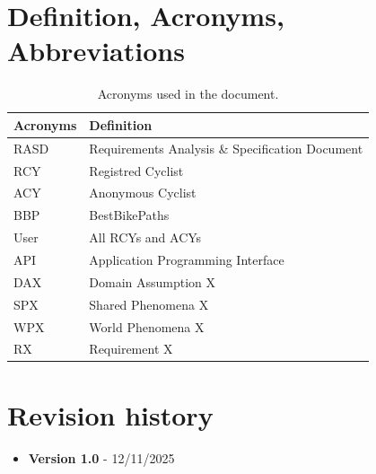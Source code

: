 \section{Definition, Acronyms, Abbreviations}
\label{sec:definition_acronyms_abbreviations}%
\begin{table}[H]
    \begin{center}
        \begin{tabular}{ |l|l| }
            \hline
            \textbf{Acronyms} & \textbf{Definition}                              \\
            \hline
            RASD             & Requirements Analysis \& Specification Document                      \\
            \hline
            RCY             & Registred Cyclist                         \\
            \hline
            ACY              & Anonymous Cyclist                         \\
            \hline
            BBP             & BestBikePaths                   \\
            \hline
            User            & All RCYs and ACYs                           \\
            \hline
            API             & Application Programming Interface                           \\
            \hline
            DAX             & Domain Assumption X                           \\
            \hline
            SPX             & Shared Phenomena X                           \\
            \hline
            WPX             & World Phenomena X                           \\
            \hline
            RX              & Requirement X                           \\
            \hline
         \end{tabular}
        \caption{Acronyms used in the document.}
        \label{tab:acronyms}%
    \end{center}
\end{table}




\section{Revision history}
\label{sec:revision_history}%
\begin{itemize}
    \item \textbf{Version 1.0} - 12/11/2025
\end{itemize}


